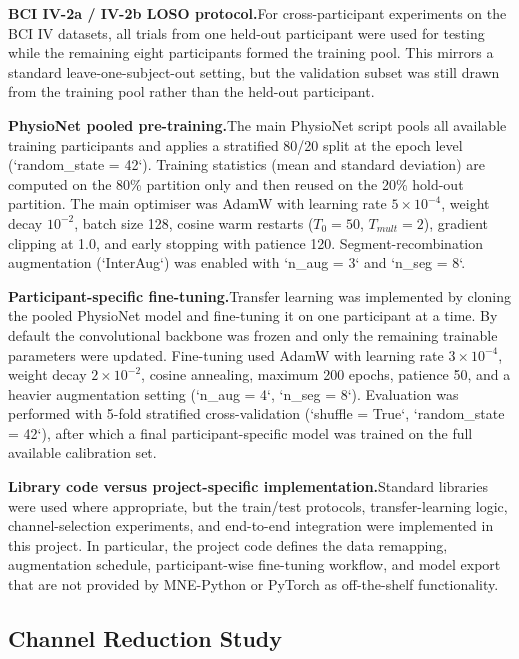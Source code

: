 \documentclass[12pt, a4paper]{article}
\begin{document}
\textbf{BCI IV-2a / IV-2b LOSO protocol.}\quad For cross-participant experiments on the BCI IV datasets, all trials from one held-out participant were used for testing while the remaining eight participants formed the training pool. This mirrors a standard leave-one-subject-out setting, but the validation subset was still drawn from the training pool rather than the held-out participant.

\textbf{PhysioNet pooled pre-training.}\quad The main PhysioNet script pools all available training participants and applies a stratified 80/20 split at the epoch level (`random\_state = 42`). Training statistics (mean and standard deviation) are computed on the 80\% partition only and then reused on the 20\% hold-out partition. The main optimiser was AdamW with learning rate $5 \times 10^{-4}$, weight decay $10^{-2}$, batch size 128, cosine warm restarts ($T_0 = 50$, $T_{mult} = 2$), gradient clipping at 1.0, and early stopping with patience 120. Segment-recombination augmentation (`InterAug`) was enabled with `n\_aug = 3` and `n\_seg = 8`.

\textbf{Participant-specific fine-tuning.}\quad Transfer learning was implemented by cloning the pooled PhysioNet model and fine-tuning it on one participant at a time. By default the convolutional backbone was frozen and only the remaining trainable parameters were updated. Fine-tuning used AdamW with learning rate $3 \times 10^{-4}$, weight decay $2 \times 10^{-2}$, cosine annealing, maximum 200 epochs, patience 50, and a heavier augmentation setting (`n\_aug = 4`, `n\_seg = 8`). Evaluation was performed with 5-fold stratified cross-validation (`shuffle = True`, `random\_state = 42`), after which a final participant-specific model was trained on the full available calibration set.

\textbf{Library code versus project-specific implementation.}\quad Standard libraries were used where appropriate, but the train/test protocols, transfer-learning logic, channel-selection experiments, and end-to-end integration were implemented in this project. In particular, the project code defines the data remapping, augmentation schedule, participant-wise fine-tuning workflow, and model export that are not provided by MNE-Python or PyTorch as off-the-shelf functionality.

\subsection{Channel Reduction Study}
\end{document}
